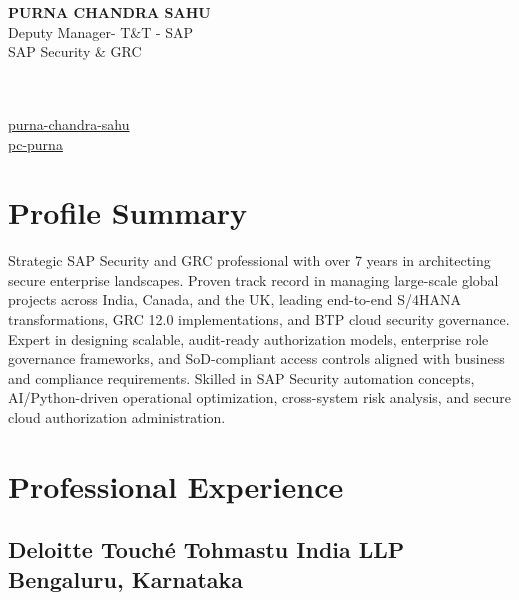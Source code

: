 \documentclass[10pt]{article}
\begin{document}
\begin{center}
	\begin{minipage}{0.5\textwidth}
		{\bfseries \Large
			PURNA CHANDRA SAHU %
		} \\ 
		Deputy Manager- T\&T - SAP \\ %
		SAP Security \& GRC

	\end{minipage} \hfill
	\begin{minipage}{0.3\textwidth}
		\footnotesize \raggedright
			\\
			 \\
			 \href {linkedin.com/in/purna-chandra-sahu}{purna-chandra-sahu} \\
			  \href {github.com/pc-purna}{pc-purna} \\
	\end{minipage}
\end{center}

\section{Profile Summary}
\begin{minipage}{1.0\textwidth}
	
	\small 
	{
		Strategic SAP Security and GRC professional with over 7 years in architecting secure enterprise landscapes. Proven track record in managing large-scale global projects across India, Canada, and the UK, leading end-to-end S/4HANA transformations, GRC 12.0 implementations, and BTP cloud security governance. Expert in designing scalable, audit-ready authorization models, enterprise role governance frameworks, and SoD-compliant access controls aligned with business and compliance requirements. Skilled in SAP Security automation concepts, AI/Python-driven operational optimization, cross-system risk analysis, and secure cloud authorization administration.
	}
\end{minipage}



\section{Professional Experience}
\subsection{Deloitte Touché Tohmastu India LLP \hfill \normalfont Bengaluru, Karnataka}
\end{document}
